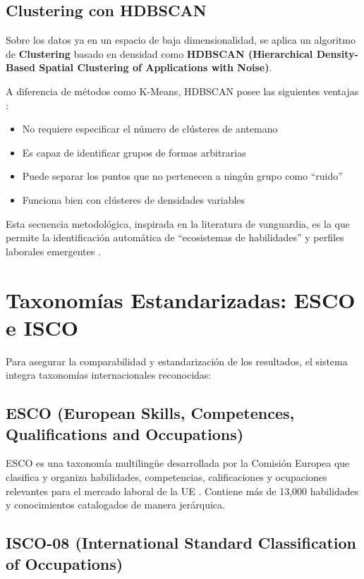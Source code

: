 \subsection{Clustering con HDBSCAN}

Sobre los datos ya en un espacio de baja dimensionalidad, se aplica un algoritmo de \textbf{Clustering} basado en densidad como \textbf{HDBSCAN (Hierarchical Density-Based Spatial Clustering of Applications with Noise)}.

A diferencia de métodos como K-Means, HDBSCAN posee las siguientes ventajas \parencite{lukauskas2023}:

\begin{itemize}
    \item No requiere especificar el número de clústeres de antemano
    \item Es capaz de identificar grupos de formas arbitrarias
    \item Puede separar los puntos que no pertenecen a ningún grupo como ``ruido''
    \item Funciona bien con clústeres de densidades variables
\end{itemize}

Esta secuencia metodológica, inspirada en la literatura de vanguardia, es la que permite la identificación automática de ``ecosistemas de habilidades'' y perfiles laborales emergentes \parencite{lukauskas2023}.

\section{Taxonomías Estandarizadas: ESCO e ISCO}

Para asegurar la comparabilidad y estandarización de los resultados, el sistema integra taxonomías internacionales reconocidas:

\subsection{ESCO (European Skills, Competences, Qualifications and Occupations)}

ESCO es una taxonomía multilingüe desarrollada por la Comisión Europea que clasifica y organiza habilidades, competencias, calificaciones y ocupaciones relevantes para el mercado laboral de la UE \parencite{kavargyris2025}. Contiene más de 13,000 habilidades y conocimientos catalogados de manera jerárquica.

\subsection{ISCO-08 (International Standard Classification of Occupations)}

